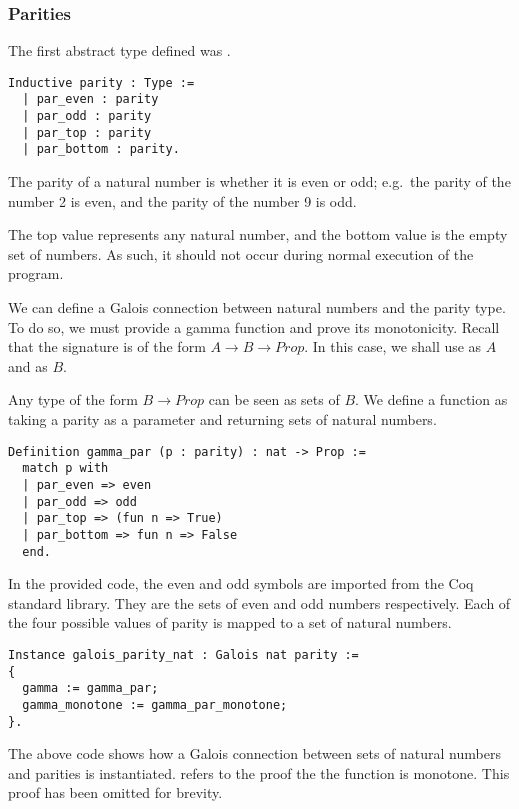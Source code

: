 \subsubsection{Parities}
The first abstract type defined was .

\begin{verbatim}
Inductive parity : Type :=
  | par_even : parity
  | par_odd : parity
  | par_top : parity
  | par_bottom : parity.
\end{verbatim}

The parity of a natural number is whether it is even or odd; e.g.\ the parity
of the number 2 is even, and the parity of the number 9 is odd.

The top value represents any natural number, and the bottom value is the empty
set of numbers. As such, it should not occur during normal execution of the 
program.

We can define a Galois connection between natural numbers and the parity type.
To do so, we must provide a gamma function and prove its monotonicity. Recall
that the signature is of the form $A \rightarrow B \rightarrow Prop$. In this
case, we shall use  as $A$ and  as $B$.

Any type of the form $B \rightarrow Prop$ can be seen as sets of $B$. We define
a function  as taking a parity as a parameter and returning
sets of natural numbers.

\begin{verbatim}
Definition gamma_par (p : parity) : nat -> Prop :=
  match p with
  | par_even => even 
  | par_odd => odd 
  | par_top => (fun n => True)
  | par_bottom => fun n => False
  end.
\end{verbatim}

In the provided code, the even and odd symbols are imported from the Coq
standard library. They are the sets of even and odd numbers respectively. Each
of the four possible values of parity is mapped to a set of natural numbers.

\begin{verbatim}
Instance galois_parity_nat : Galois nat parity :=
{
  gamma := gamma_par;
  gamma_monotone := gamma_par_monotone;
}.
\end{verbatim}

The above code shows how a Galois connection between sets of natural numbers 
and parities is instantiated.  refers to the proof the
the  function is monotone. This proof has been omitted for 
brevity.

